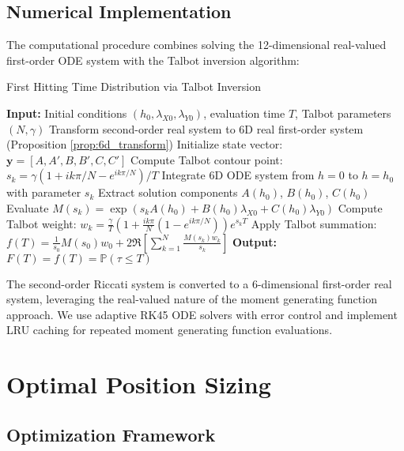 \documentclass{article}
\renewcommand{\P}{\mathbb{P}}
\theoremstyle{definition}
\begin{document}
\subsection{Numerical Implementation}

The computational procedure combines solving the 12-dimensional real-valued first-order ODE system with the Talbot inversion algorithm:

\begin{algorithm}
\caption{First Hitting Time Distribution via Talbot Inversion}
\begin{algorithmic}[1]
\STATE \textbf{Input:} Initial conditions $(h_0, \lambda_{X0}, \lambda_{Y0})$, evaluation time $T$, Talbot parameters $(N, \gamma)$
\STATE Transform second-order real system to 6D real first-order system (Proposition \ref{prop:6d_transform})
\STATE Initialize state vector: $\mathbf{y} = [A, A', B, B', C, C']$
    \STATE Compute Talbot contour point: $s_k = \gamma(1 + ik\pi/N - e^{ik\pi/N})/T$
    \STATE Integrate 6D ODE system from $h = 0$ to $h = h_0$ with parameter $s_k$
    \STATE Extract solution components $A(h_0)$, $B(h_0)$, $C(h_0)$
    \STATE Evaluate $M(s_k) = \exp(s_k A(h_0) + B(h_0)\lambda_{X0} + C(h_0)\lambda_{Y0})$
    \STATE Compute Talbot weight: $w_k = \frac{\gamma}{T} \left(1 + \frac{ik\pi}{N}(1-e^{ik\pi/N}) \right) e^{s_k T}$
\ENDFOR
\STATE Apply Talbot summation: $f(T) = \frac{1}{s_0} M(s_0) w_0 + 2\Re\left[\sum_{k=1}^{N} \frac{M(s_k) w_k}{s_k}\right]$
\STATE \textbf{Output:} $F(T) = f(T) = \P(\tau \leq T)$
\end{algorithmic}
\end{algorithm}

The second-order Riccati system is converted to a 6-dimensional first-order real system, leveraging the real-valued nature of the moment generating function approach. We use adaptive RK45 ODE solvers with error control and implement LRU caching for repeated moment generating function evaluations.

\section{Optimal Position Sizing}

\subsection{Optimization Framework}
\end{document}

